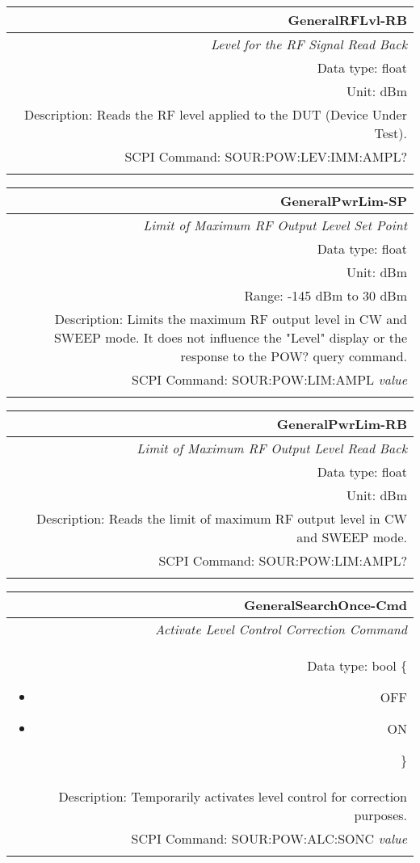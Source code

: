 \documentclass[openany]{article}
\begin{document}
		\begin{tabular}{N}
			\hline
			\bfseries GeneralRFLvl-RB \\ \hline
			\emph{Level for the RF Signal Read Back} \\
			Data type: float \\
			Unit: dBm \\
			Description: Reads the RF level applied to the DUT (Device Under Test). \\
			SCPI Command: SOUR:POW:LEV:IMM:AMPL? \\
			\\ 

		\end{tabular}


		\begin{tabular}{N}
			\hline
			\bfseries GeneralPwrLim-SP \\ \hline
			\emph{Limit of Maximum RF Output Level Set Point} \\
			Data type: float \\
			Unit: dBm \\
			Range: -145 dBm to 30 dBm \\
			Description: Limits the maximum RF output level in CW and SWEEP mode. It does not influence the "Level" display or the response to the POW? query command. \\
			SCPI Command: SOUR:POW:LIM:AMPL \emph{value} \\
			\\
			
		\end{tabular}


		\begin{tabular}{N}
			\hline
			\bfseries GeneralPwrLim-RB \\ \hline
			\emph{Limit of Maximum RF Output Level Read Back} \\
			Data type: float \\
			Unit: dBm \\
			Description: Reads the limit of maximum RF output level in CW and SWEEP mode. \\
			SCPI Command: SOUR:POW:LIM:AMPL? \\
			\\

		\end{tabular}


		\begin{tabular}{N}
			\hline
			\bfseries GeneralSearchOnce-Cmd \\ \hline
			\emph{Activate Level Control Correction Command} \\
			Data type: bool \{\begin{itemize}[noitemsep]
				\small
				\item[] OFF
				\item[] ON
			\end{itemize}\} \\
			Description: Temporarily activates level control for correction purposes. \\
			SCPI Command: SOUR:POW:ALC:SONC \emph{value} \\
			\\

		\end{tabular}
\end{document}
